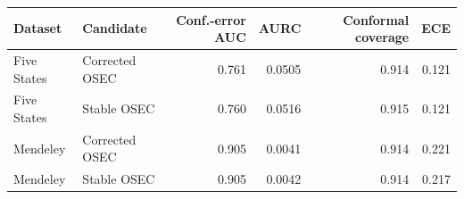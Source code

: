 \begin{tabular}{llrrrr}
\toprule
Dataset & Candidate & Conf.-error AUC & AURC & Conformal coverage & ECE \\
\midrule
Five States & Corrected OSEC & 0.761 & 0.0505 & 0.914 & 0.121 \\
Five States & Stable OSEC & 0.760 & 0.0516 & 0.915 & 0.121 \\
Mendeley & Corrected OSEC & 0.905 & 0.0041 & 0.914 & 0.221 \\
Mendeley & Stable OSEC & 0.905 & 0.0042 & 0.914 & 0.217 \\
\bottomrule
\end{tabular}
